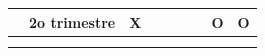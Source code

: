 \begin{table}[!h]
\begin{tabular}{ccccccccc}
\multicolumn{1}{|c|}{} & \multicolumn{1}{c|}{2o trimestre} & \multicolumn{1}{c|}{X} & \multicolumn{1}{c|}{} & \multicolumn{1}{c|}{} & \multicolumn{1}{c|}{} & \multicolumn{1}{c|}{} & \multicolumn{1}{c|}{O} & \multicolumn{1}{c|}{O} \\ \hline
\multicolumn{1}{l}{} & \multicolumn{1}{l}{} & \multicolumn{1}{l}{} & \multicolumn{1}{l}{} & \multicolumn{1}{l}{} & \multicolumn{1}{l}{} & \multicolumn{1}{l}{} & \multicolumn{1}{l}{} & \multicolumn{1}{l}{} \\
\multicolumn{1}{l}{} & \multicolumn{1}{l}{} & \multicolumn{1}{l}{} & \multicolumn{1}{l}{} & \multicolumn{1}{l}{} & \multicolumn{1}{l}{} & \multicolumn{1}{l}{} & \multicolumn{1}{l}{} & \multicolumn{1}{l}{}
\end{tabular}
\end{table}
